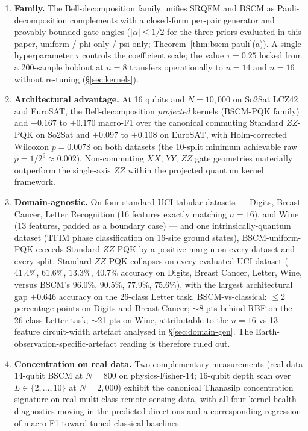 \documentclass[pdflatex,sn-mathphys]{sn-jnl}
\theoremstyle{plain}
\theoremstyle{remark}
\theoremstyle{definition}
\begin{document}
\begin{enumerate}
  \item \textbf{Family.} The Bell-decomposition family unifies SRQFM and BSCM as Pauli-decomposition complements with a closed-form per-pair generator and provably bounded gate angles ($|\alpha|\le 1/2$ for the three priors evaluated in this paper, uniform / phi-only / psi-only; Theorem~\ref{thm:bscm-pauli}(a)).  A single hyperparameter $\tau$ controls the coefficient scale; the value $\tau=0.25$ locked from a 200-sample holdout at $n=8$ transfers operationally to $n=14$ and $n=16$ without re-tuning (\S\ref{sec:kernels}).
  \item \textbf{Architectural advantage.} At 16 qubits and $N=10{,}000$ on So2Sat LCZ42 and EuroSAT, the Bell-decomposition \emph{projected} kernels (BSCM-PQK family) add $+0.167$ to $+0.170$ macro-F1 over the canonical commuting Standard $ZZ$-PQK on So2Sat and $+0.097$ to $+0.108$ on EuroSAT, with Holm-corrected Wilcoxon $p = 0.0078$ on both datasets (the 10-split minimum achievable raw $p = 1/2^{9} \approx 0.002$).  Non-commuting $XX$, $YY$, $ZZ$ gate geometries materially outperform the single-axis $ZZ$ within the projected quantum kernel framework.
  \item \textbf{Domain-agnostic.} On four standard UCI tabular datasets --- Digits, Breast Cancer, Letter Recognition (16 features exactly matching $n=16$), and Wine (13 features, padded as a boundary case) --- and one intrinsically-quantum dataset (TFIM phase classification on 16-site ground states), BSCM-uniform-PQK exceeds Standard-$ZZ$-PQK by a positive margin on every dataset and every split.  Standard-$ZZ$-PQK collapses on every evaluated UCI dataset ($41.4\%$, $61.6\%$, $13.3\%$, $40.7\%$ accuracy on Digits, Breast Cancer, Letter, Wine, versus BSCM's $96.0\%$, $90.5\%$, $77.9\%$, $75.6\%$), with the largest architectural gap $+0.646$ accuracy on the 26-class Letter task.  BSCM-vs-classical: $\le$2 percentage points on Digits and Breast Cancer; $\sim$8 pts behind RBF on the 26-class Letter task; $\sim$21 pts on Wine, attributable to the $n=16$-vs-13-feature circuit-width artefact analysed in \S\ref{sec:domain-gen}.  The Earth-observation-specific-artefact reading is therefore ruled out.
  \item \textbf{Concentration on real data.} Two complementary measurements (real-data 14-qubit BSCM at $N=800$ on physics-Fisher-14; 16-qubit depth scan over $L\in\{2,\dots,10\}$ at $N=2{,}000$) exhibit the canonical Thanasilp concentration signature \cite{thanasilp2024} on real multi-class remote-sensing data, with all four kernel-health diagnostics moving in the predicted directions and a corresponding regression of macro-F1 toward tuned classical baselines.
\end{enumerate}
\end{document}
